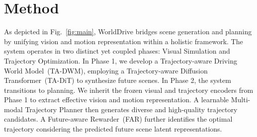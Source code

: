 \section{Method}

As depicted in Fig.~\ref{fig:main}, WorldDrive bridges scene generation and planning by unifying vision and motion representation within a holistic framework. The system operates in two distinct yet coupled phases: Visual Simulation and Trajectory Optimization. In Phase 1, we develop a Trajectory-aware Driving World Model~(TA-DWM), employing a Trajectory-aware Diffusion Transformer~(TA-DiT) to synthesize future scenes. In Phase 2, the system transitions to planning. We inherit the frozen visual and trajectory encoders from Phase 1 to extract effective vision and motion representation. A learnable Multi-modal Trajectory Planner then generates diverse and high-quality trajectory candidates. A Future-aware Rewarder~(FAR) further identifies the optimal trajectory considering the predicted future scene latent representations.

